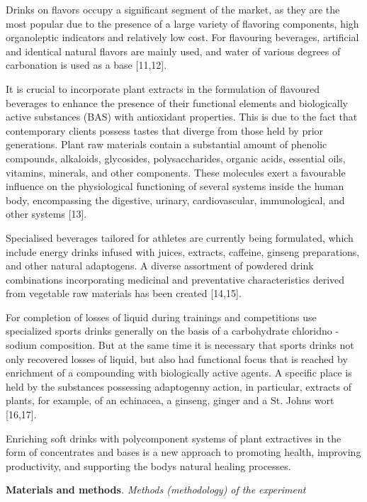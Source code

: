 Drinks on flavors occupy a significant segment of the market, as they
are the most popular due to the presence of a large variety of flavoring
components, high organoleptic indicators and relatively low cost. For
flavouring beverages, artificial and identical natural flavors are
mainly used, and water of various degrees of carbonation is used as a
base {[}11,12{]}.

It is crucial to incorporate plant extracts in the formulation of
flavoured beverages to enhance the presence of their functional elements
and biologically active substances (BAS) with antioxidant properties.
This is due to the fact that contemporary clients possess tastes that
diverge from those held by prior generations. Plant raw materials
contain a substantial amount of phenolic compounds, alkaloids,
glycosides, polysaccharides, organic acids, essential oils, vitamins,
minerals, and other components. These molecules exert a favourable
influence on the physiological functioning of several systems inside the
human body, encompassing the digestive, urinary, cardiovascular,
immunological, and other systems {[}13{]}.~

Specialised beverages tailored for athletes are currently being
formulated, which include energy drinks infused with juices, extracts,
caffeine, ginseng preparations, and other natural adaptogens. A diverse
assortment of powdered drink combinations incorporating medicinal and
preventative characteristics derived from vegetable raw materials has
been created {[}14,15{]}.

For completion of losses of liquid during trainings and competitions use
specialized sports drinks generally on the basis of a carbohydrate
chloridno - sodium composition. But at the same time it is necessary
that sports drinks not only recovered losses of liquid, but also had
functional focus that is reached by enrichment of a compounding with
biologically active agents. A specific place is held by the substances
possessing adaptogenny action, in particular, extracts of plants, for
example, of an echinacea, a ginseng, ginger and a St.
John\textquotesingle s wort {[}16,17{]}.

Enriching soft drinks with polycomponent systems of plant extractives in
the form of concentrates and bases is a new approach to promoting
health, improving productivity, and supporting the
body\textquotesingle s natural healing processes.

{\bfseries Materials and methods}\emph{. Methods (methodology) of the
experiment}


